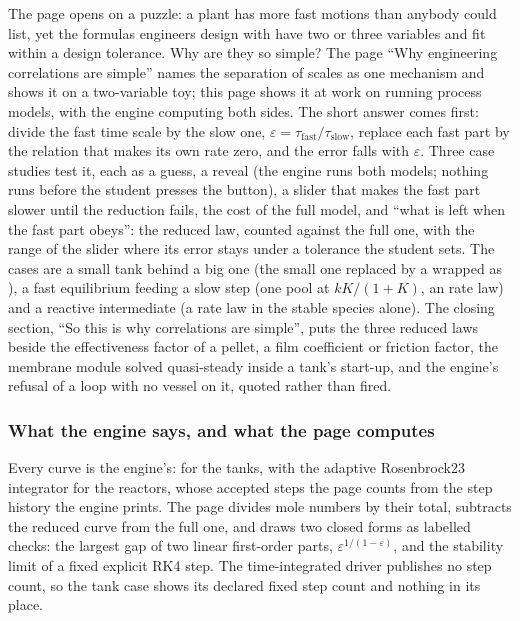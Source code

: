 \documentclass[11pt,a4paper]{article}
\begin{document}
The page opens on a puzzle: a plant has more fast motions than anybody could
list, yet the formulas engineers design with have two or three variables and
fit within a design tolerance.  Why are they so simple?  The page ``Why
engineering correlations are simple'' names the separation of scales as one
mechanism and shows it on a two-variable toy; this page shows it at work on
running process models, with the engine computing both sides.  The short
answer comes first: divide the fast time scale by the slow one,
$\varepsilon = \tau_\mathrm{fast}/\tau_\mathrm{slow}$, replace each fast part
by the relation that makes its own rate zero, and the error falls with
$\varepsilon$.  Three case studies test it, each as a guess, a reveal (the
engine runs both models; nothing runs before the student presses the button),
a slider that makes the fast part slower until the reduction fails, the cost
of the full model, and ``what is left when the fast part obeys'': the reduced
law, counted against the full one, with the range of the slider where its error
stays under a tolerance the student sets.  The cases are a small tank behind a
big one (the small one replaced by a  wrapped as
), a fast equilibrium feeding a slow step (one pool at
$kK/(1+K)$, an  rate law) and a reactive intermediate (a rate
law in the stable species alone).  The closing section, ``So this is why
correlations are simple'', puts the three reduced laws beside the
effectiveness factor of a pellet, a film coefficient or friction factor, the
membrane module solved quasi-steady inside a tank's start-up, and the engine's
refusal of a loop with no vessel on it, quoted rather than fired.

\subsubsection*{What the engine says, and what the page computes}

Every curve is the engine's:  for the tanks,
 with the adaptive Rosenbrock23 integrator for the reactors,
whose accepted steps the page counts from the step history the engine prints.
The page divides mole numbers by their total, subtracts the reduced curve from
the full one, and draws two closed forms as labelled checks: the largest gap of
two linear first-order parts, $\varepsilon^{1/(1-\varepsilon)}$, and the
stability limit of a fixed explicit RK4 step.  The time-integrated driver
publishes no step count, so the tank case shows its declared fixed step count
and nothing in its place.
\end{document}
